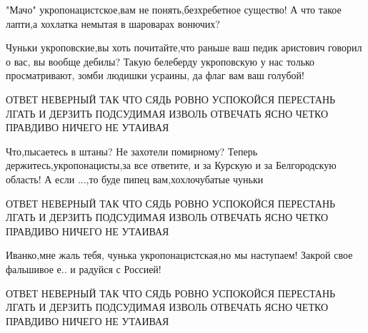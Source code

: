 \qqPodsudimyj

"Мачо" укропонацистское,вам не понять,безхребетное существо! А что такое
лапти,а хохлатка немытая в шароварах вонючих?

\qqPodsudimyj

Чуньки укроповские,вы хоть почитайте,что раньше ваш педик аристович говорил о
вас, вы вообще дебилы? Такую белеберду укроповскую у нас только просматривают,
зомби людишки усраины, да флаг вам ваш голубой!

\qqSledovatel

ОТВЕТ НЕВЕРНЫЙ ТАК ЧТО СЯДЬ РОВНО УСПОКОЙСЯ ПЕРЕСТАНЬ ЛГАТЬ И ДЕРЗИТЬ
ПОДСУДИМАЯ ИЗВОЛЬ ОТВЕЧАТЬ ЯСНО ЧЕТКО ПРАВДИВО НИЧЕГО НЕ УТАИВАЯ

\qqSledovatel

\qqSudVopros

\qqPodsudimyj

Что,пысаетесь в штаны? Не захотели помирному? Теперь держитесь,укропонацисты,за
все ответите, и за Курскую и за Белгородскую область! А если ...,то буде пипец
вам,хохлочубатые чуньки

\qqSledovatel

ОТВЕТ НЕВЕРНЫЙ ТАК ЧТО СЯДЬ РОВНО УСПОКОЙСЯ ПЕРЕСТАНЬ ЛГАТЬ И ДЕРЗИТЬ
ПОДСУДИМАЯ ИЗВОЛЬ ОТВЕЧАТЬ ЯСНО ЧЕТКО ПРАВДИВО НИЧЕГО НЕ УТАИВАЯ

\qqSledovatel

\qqSudVopros

\qqPodsudimyj

Иванко,мне жаль тебя, чунька укропонацистская,но мы наступаем! Закрой свое
фальшивое е.. и радуйся с Россией!

\qqSledovatel

ОТВЕТ НЕВЕРНЫЙ ТАК ЧТО СЯДЬ РОВНО УСПОКОЙСЯ ПЕРЕСТАНЬ ЛГАТЬ И ДЕРЗИТЬ
ПОДСУДИМАЯ ИЗВОЛЬ ОТВЕЧАТЬ ЯСНО ЧЕТКО ПРАВДИВО НИЧЕГО НЕ УТАИВАЯ

\qqSledovatel

\qqSudVopros
